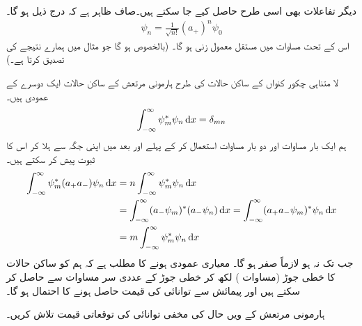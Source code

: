 دیگر تفاعلات بھی اسی طرح حاصل کیے جا سکتے ہیں۔صاف ظاہر ہے کہ درج ذیل ہو گا۔ 
\begin{align}\label{مساوات_شروڈنگر_ہارمونی_ساکن_حالات}
\psi_n = \frac{1}{ \sqrt{n!} } ( a_+ )^n \psi_0
\end{align}
اس کے تحت مساوات  میں مستقل معمول  زنی  ہو گا۔   (بالخصوص  ہو گا جو مثال  میں ہمارے نتیجے کی تصدیق کرتا ہے۔)
 
لا متناہی  چکور کنواں کے ساکن حالات کی طرح ہارمونی مرتعش کے ساکن حالات ایک دوسرے کے  عمودی ہیں۔ 
\begin{align}
\int_{ - \infty }^{ \infty } \psi_m^*\psi_n \dif x = \delta_{mn}
\end{align}
ہم ایک بار مساوات  اور دو بار مساوات  استعمال کر کے  پہلے    اور بعد میں  اپنی جگہ سے ہلا کر اس کا ثبوت پیش کر سکتے ہیں۔
\begin{align*}
\int_{ - \infty }^{ \infty } \psi_m^*(a_+ a_- )\psi_n \dif x &= n \int_{ - \infty }^{ \infty } \psi_m^* \psi_n \dif x
\\
&=\int_{ - \infty }^{ \infty } ( a_- \psi_m  )^*( a_- \psi_n ) \dif x = \int_{ - \infty }^{ \infty } ( a_+ a_- \psi_m)^* \psi_n \dif x\\
&= m \int_{ - \infty }^{ \infty } \psi_m^* \psi_n \dif x
\end{align*}
جب تک   نہ ہو   لازماً صفر ہو گا۔ معیاری عمودی ہونے کا مطلب  ہے کہ ہم 
 کو  ساکن حالات  کا خطی جوڑ (مساوات ) لکھ کر خطی جوڑ  کے عددی سر  مساوات  سے حاصل کر سکتے ہیں اور   پیمائش سے توانائی کی قیمت   حاصل ہونے کا  احتمال  ہو گا۔

ہارمونی مرتعش کے  ویں حال کی مخفی توانائی کی توقعاتی قیمت تلاش کریں۔

